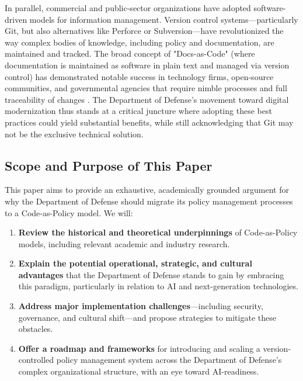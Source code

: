 \documentclass[11pt]{article}
\begin{document}
	In parallel, commercial and public-sector organizations have adopted software-driven models for information management. Version control systems---particularly Git, but also alternatives like Perforce or Subversion---have revolutionized the way complex bodies of knowledge, including policy and documentation, are maintained and tracked. The broad concept of "Docs-as-Code" (where documentation is maintained as software in plain text and managed via version control) has demonstrated notable success in technology firms, open-source communities, and governmental agencies that require nimble processes and full traceability of changes \cite{WrightMartin2018}. The Department of Defense's movement toward digital modernization thus stands at a critical juncture where adopting these best practices could yield substantial benefits, while still acknowledging that Git may not be the exclusive technical solution.

	\subsection{Scope and Purpose of This Paper}
	This paper aims to provide an exhaustive, academically grounded argument for why the Department of Defense should migrate its policy management processes to a Code-as-Policy model. We will:

	\begin{enumerate}[label=(\roman*)]
		\item \textbf{Review the historical and theoretical underpinnings} of Code-as-Policy models, including relevant academic and industry research.
		\item \textbf{Explain the potential operational, strategic, and cultural advantages} that the Department of Defense stands to gain by embracing this paradigm, particularly in relation to AI and next-generation technologies.
		\item \textbf{Address major implementation challenges}---including security, governance, and cultural shift---and propose strategies to mitigate these obstacles.
		\item \textbf{Offer a roadmap and frameworks} for introducing and scaling a version-controlled policy management system across the Department of Defense's complex organizational structure, with an eye toward AI-readiness.
	\end{enumerate}
\end{document}
